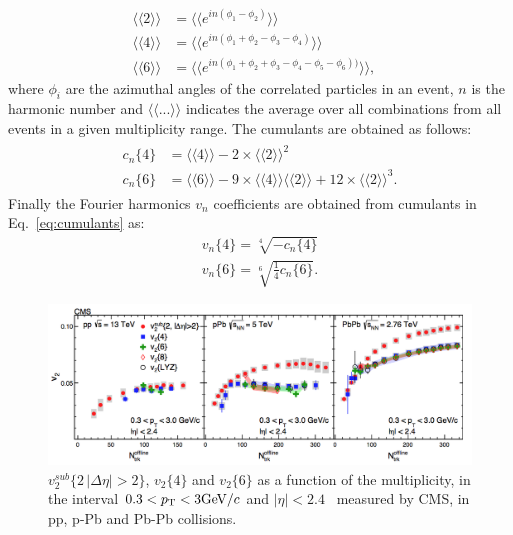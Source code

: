 \begin{equation}
\label{correlations}
\begin{aligned}
\langle \langle 2 \rangle \rangle &= \langle \langle e^{in(\phi_1 -\phi_2)} \rangle \rangle &\\
\langle \langle 4 \rangle \rangle &= \langle \langle e^{in(\phi_1 + \phi_2 -\phi_3 - \phi_4)} \rangle \rangle &\\
\langle \langle 6 \rangle \rangle &= \langle \langle e^{in(\phi_1 + \phi_2 +\phi_3 - \phi_4- \phi_5- \phi_6))} \rangle \rangle,&
\end{aligned}
\end{equation}
where $\phi_i$ are the azimuthal angles of the correlated particles in an event, $n$ is the harmonic number and $\langle \langle ... \rangle \rangle$ indicates the average over all combinations from all events in a given multiplicity range. The cumulants are obtained as follows:
\begin{equation}
\label{eq:cumulants}
\begin{aligned}
\begin{split}
c_n\{4\} &= \langle \langle 4 \rangle \rangle - 2 \times  \langle \langle 2 \rangle \rangle^2 \\
c_n\{6\} &= \langle \langle 6 \rangle \rangle - 9 \times  \langle \langle 4 \rangle \rangle \langle \langle 2 \rangle \rangle + 12 \times \langle \langle 2 \rangle \rangle^3.
\end{split}
\end{aligned}
\end{equation}
Finally the Fourier harmonics $v_n$ coefficients are obtained from cumulants in Eq.~\ref{eq:cumulants} as:
\begin{equation}
\begin{aligned}
v_n \{4\} = \sqrt[4]{-c_n\{4\}} \\
v_n \{6\} = \sqrt[6]{\frac{1}{4}c_n\{6\}}.
\end{aligned}
\end{equation}
\begin{figure}[!ht]
  \centering
  \includegraphics[width=15cm]{FigCap1/v2CumulantsCMS.png}
  \caption{$v_2^{sub} \{2\, |\Delta \eta| > 2\}$, $v_2 \{4\}$ and $v_2 \{6\}$  as a function of the multiplicity, in the interval $0.3 < p_{\rm T} < 3 \mathrm{GeV}/c$ and $|\eta| < 2.4$~\cite{Khachatryan:2016txc} measured by CMS, in pp, p-Pb and Pb-Pb collisions.}
  \label{fig:CumulantsCMS}
\end{figure}

